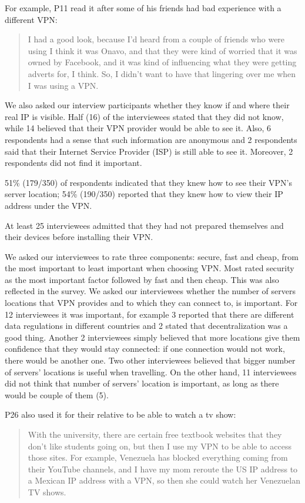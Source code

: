 For example, P11 read it after some of his friends had bad experience with a
different VPN: \begin{quote}I had a good look, because I'd heard from a couple of friends
who were using I think it was Onavo, and that they were kind of worried
that it was owned by Facebook, and it was kind of influencing what they were
getting adverts for, I think.  So, I didn't want to have that lingering
over me when I was using a VPN.  \end{quote}


We also asked our interview participants whether they know if and where their
real IP is visible. Half (16) of the interviewees stated that they did not
know, while 14 believed that their VPN provider would be able to see it. Also,
6 respondents had a sense that such information are anonymous and 2
respondents said that their Internet Service Provider (ISP) is still able to
see it. Moreover, 2 respondents did not find it important.

51\% (179/350) of respondents indicated that they knew how to see their
VPN’s server location; 54\% (190/350) reported that they knew how to view
their IP address under the VPN.

At least 25 interviewees admitted
that they had not prepared themselves and their devices before installing
their VPN.

 We asked our interviewees to rate three
components: secure, fast and cheap, from the most important to least important
when choosing VPN. Most rated security as the most important factor followed by fast and then cheap. This was also reflected in the survey.
We asked our interviewees whether the number of servers
locations that VPN provides and to which they can connect to, is important.
For 12 interviewees it was important, for example 3 reported that there are
different data regulations in different countries and 2 stated that
decentralization was a good thing. Another 2 interviewees simply believed that
more locations give them confidence that they would stay connected: if one
connection would not work, there would be another one. Two other interviewees
believed that bigger number of servers’ locations is useful when travelling.
On the other hand, 11 interviewees did not think that number of servers’
location is important, as long as there would be couple of them (5). 

P26 also used it for their relative to be able to watch a tv show:
\begin{quote}With the university, there
    are certain free textbook websites that they don't like students going on,
    but then I use my VPN to be able to access those sites. For example,
    Venezuela has blocked everything coming from their YouTube channels, and I
    have my mom reroute the US IP address to a Mexican IP address with a VPN,
    so then she could watch her Venezuelan TV shows.\end{quote}
    
